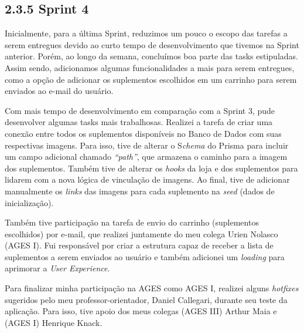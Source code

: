\hypertarget{__RefHeading___Toc4751_3118176633}{}
\subsection*{2.3.5 Sprint 4}
\label{unit:ages-i-sprint-4}

\indent \originaltab{}Inicialmente, para a última Sprint, reduzimos um pouco o escopo das tarefas a serem entregues devido ao curto tempo de desenvolvimento que tivemos na Sprint anterior. Porém, ao longo da semana, concluímos boa parte das tasks estipuladas. Assim sendo, adicionamos algumas funcionalidades a mais para serem entregues, como a opção de adicionar os suplementos escolhidos em um carrinho para serem enviados ao e-mail do usuário.

\indent \originaltab{}Com mais tempo de desenvolvimento em comparação com a Sprint 3, pude desenvolver algumas tasks mais trabalhosas. Realizei a tarefa de criar uma conexão entre todos os suplementos disponíveis no Banco de Dados com suas respectivas imagens. Para isso, tive de alterar o S\textit{chema} do Prisma para incluir um campo adicional chamado \textit{“path”}, que armazena o caminho para a imagem dos suplementos. Também tive de alterar os \textit{hooks} da loja e dos suplementos para lidarem com a nova lógica de vinculação de imagens. Ao final, tive de adicionar manualmente os \textit{links }das imagens para cada suplemento na \textit{seed }(dados de inicialização).

\indent \originaltab{}Também tive participação na tarefa de envio do carrinho (suplementos escolhidos) por e-mail, que realizei juntamente do meu colega Urien Nolasco (AGES I). Fui responsável por criar a estrutura capaz de receber a lista de suplementos a serem enviados ao usuário e também adicionei um \textit{loading }para aprimorar a \textit{User Experience}.

\indent \originaltab{}Para finalizar minha participação na AGES como AGES I, realizei alguns \textit{hotfixes} sugeridos pelo meu professor-orientador, Daniel Callegari, durante seu teste da aplicação. Para isso, tive apoio dos meus colegas (AGES III) Arthur Maia e (AGES I) Henrique Knack.

